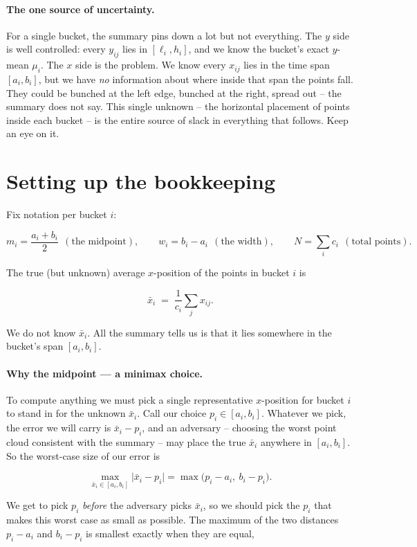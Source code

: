 \documentclass[11pt]{article}
\begin{document}
\paragraph{The one source of uncertainty.}
For a single bucket, the summary pins down a lot but not everything.
The $y$ side is well controlled: every $y_{ij}$ lies in $[\ell_i,h_i]$,
and we know the bucket's exact $y$-mean $\mu_i$. The $x$ side is the
problem. We know every $x_{ij}$ lies in the time span $[a_i,b_i]$, but
we have \emph{no} information about where inside that span the points
fall. They could be bunched at the left edge, bunched at the right,
spread out -- the summary does not say. This single unknown -- the
horizontal placement of points inside each bucket -- is the entire
source of slack in everything that follows. Keep an eye on it.

\section{Setting up the bookkeeping}

Fix notation per bucket $i$:

\[
m_i=\frac{a_i+b_i}{2}\ \ (\text{the midpoint}),
\qquad
w_i=b_i-a_i\ \ (\text{the width}),
\qquad
N=\sum_i c_i\ \ (\text{total points}).
\]

The true (but unknown) average $x$-position of the points in bucket
$i$ is

\[
\bar x_i \;=\; \frac{1}{c_i}\sum_j x_{ij}.
\]

We do not know $\bar x_i$. All the summary tells us is that it lies
somewhere in the bucket's span $[a_i,b_i]$.

\paragraph{Why the midpoint --- a minimax choice.}
To compute anything we must pick a single representative $x$-position
for bucket $i$ to stand in for the unknown $\bar x_i$. Call our choice
$p_i\in[a_i,b_i]$. Whatever we pick, the error we will carry is
$\bar x_i-p_i$, and an adversary -- choosing the worst point cloud
consistent with the summary -- may place the true $\bar x_i$ anywhere
in $[a_i,b_i]$. So the worst-case size of our error is

\[
\max_{\bar x_i\in[a_i,b_i]}\bigl|\bar x_i-p_i\bigr|
=\max\bigl(p_i-a_i,\ b_i-p_i\bigr).
\]

We get to pick $p_i$ \emph{before} the adversary picks $\bar x_i$, so
we should pick the $p_i$ that makes this worst case as small as
possible. The maximum of the two distances $p_i-a_i$ and $b_i-p_i$ is
smallest exactly when they are equal,
\end{document}
